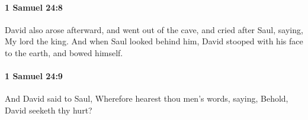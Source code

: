 		\paragraph{1 Samuel 24:8} %
			\label{1SAMUEL-24-8}

			David also arose afterward, and went out of the cave, and cried after Saul, saying, My lord the king. And when Saul looked behind him, David stooped with his face to the earth, and bowed himself.


		\paragraph{1 Samuel 24:9} %
			\label{1SAMUEL-24-9}

			And David said to Saul, Wherefore hearest thou men’s words, saying, Behold, David seeketh thy hurt?



